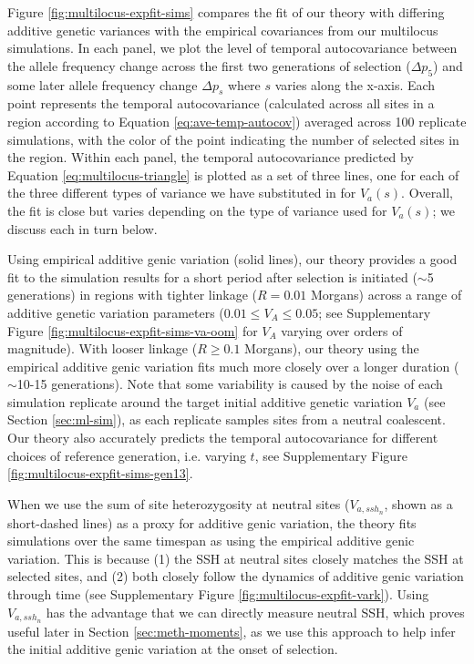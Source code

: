 \documentclass[11pt]{article}
\begin{document}
Figure \ref{fig:multilocus-expfit-sims} compares the fit of our theory with
differing additive genetic variances with the empirical
covariances from our multilocus simulations. In each panel, we plot the level
of temporal autocovariance between the allele frequency change across the first
two generations of selection ($\Delta p_5$) and some later allele frequency
change $\Delta p_s$ where $s$ varies along the x-axis. Each point represents
the temporal autocovariance (calculated across all sites in a region according
to Equation \ref{eq:ave-temp-autocov}) averaged across 100 replicate
simulations, with the color of the point indicating the number of selected
sites in the region. Within each panel, the temporal autocovariance predicted
by Equation \eqref{eq:multilocus-triangle} is plotted as a set of three
lines, one for each of the three different types of variance we have
substituted in for $V_a(s)$. Overall, the fit is close but varies depending on
the type of variance used for $V_a(s)$; we discuss each in turn below.

Using empirical additive genic variation (solid lines), our theory provides a
good fit to the simulation results for a short period after selection is
initiated ($\sim$5 generations) in regions with tighter linkage ($R=0.01$
Morgans) across a range of additive genetic variation parameters ($0.01 \le V_A
\le 0.05$; see Supplementary Figure \ref{fig:multilocus-expfit-sims-va-oom} for
$V_A$ varying over orders of magnitude). With looser linkage ($R \ge 0.1$
Morgans), our theory using the empirical additive genic variation fits much
more closely over a longer duration ($\sim$10-15 generations). Note that some
variability is caused by the noise of each simulation replicate around the
target initial additive genetic variation $V_a$ (see Section \ref{sec:ml-sim}),
as each replicate samples sites from a neutral coalescent. Our theory also
accurately predicts the temporal autocovariance for different choices of
reference generation, i.e.  varying $t$, see Supplementary Figure
\ref{fig:multilocus-expfit-sims-gen13}.

When we use the sum of site heterozygosity at neutral sites ($V_{a,ssh_n}$,
shown as a short-dashed lines) as a proxy for additive genic variation, the
theory fits simulations over the same timespan as using the empirical additive
genic variation. This is because (1) the SSH at neutral sites closely matches
the SSH at selected sites, and (2) both closely follow the dynamics of additive
genic variation through time (see Supplementary Figure
\ref{fig:multilocus-expfit-vark}). Using $V_{a,ssh_n}$ has the advantage that
we can directly measure neutral SSH, which proves useful later in Section
\ref{sec:meth-moments}, as we use this approach to help infer the initial
additive genic variation at the onset of selection.
\end{document}

